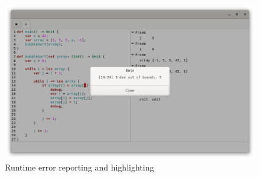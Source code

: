 \documentclass[11pt, american, draft]{PhdThesis}
\begin{document}
  \begin{figure}[H]
    \center
    \includegraphics[width=0.9\linewidth]{6.png}
    \caption{Runtime error reporting and highlighting}
  \end{figure}

  \backmatter





  \backmatter

  \printbibliography

\end{document}
